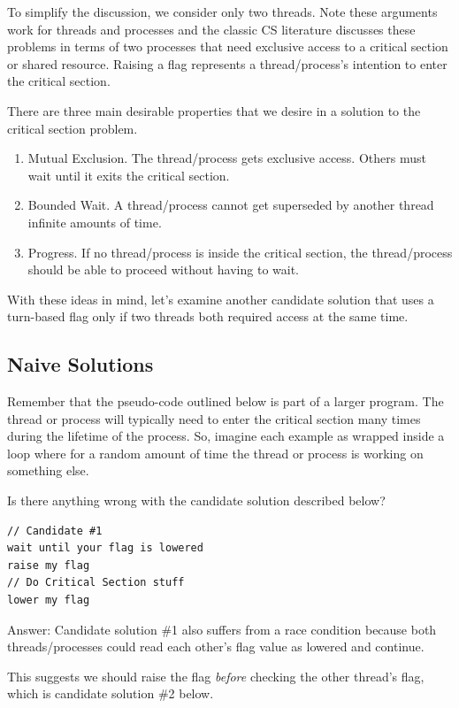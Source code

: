 To simplify the discussion, we consider only two threads.
Note these arguments work for threads and processes and the classic CS literature discusses these problems in terms of two processes that need exclusive access to a critical section or shared resource.
Raising a flag represents a thread/process's intention to enter the critical section.

There are three main desirable properties that we desire in a solution to the critical section problem.

\begin{enumerate}
\item Mutual Exclusion. The thread/process gets exclusive access.
  Others must wait until it exits the critical section.
\item Bounded Wait. A thread/process cannot get superseded by another thread infinite amounts of time.
\item Progress. If no thread/process is inside the critical section, the thread/process should be able to proceed without having to wait.
\end{enumerate}

With these ideas in mind, let's examine another candidate solution that uses a turn-based flag only if two threads both required access at the same time.

\subsection{Naive Solutions}

Remember that the pseudo-code outlined below is part of a larger program.
The thread or process will typically need to enter the critical section many times during the lifetime of the process.
So, imagine each example as wrapped inside a loop where for a random amount of time the thread or process is working on something else.

Is there anything wrong with the candidate solution described below?

\begin{lstlisting}
// Candidate #1
wait until your flag is lowered
raise my flag
// Do Critical Section stuff
lower my flag
\end{lstlisting}

Answer: Candidate solution \#1 also suffers from a race condition because both threads/processes could read each other's flag value as lowered and continue.

This suggests we should raise the flag \emph{before} checking the other thread's flag, which is candidate solution \#2 below.

